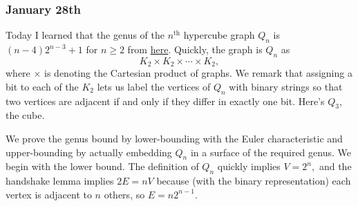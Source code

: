 \subsubsection{January 28th}
Today I learned that the genus of the $n^\text{th}$ hypercube graph $Q_n$ is $(n-4)2^{n-3}+1$ for $n\ge2$ from \href{https://www.cambridge.org/core/journals/canadian-journal-of-mathematics/article/genus-of-the-ncube/C0E3405F0B3267A4792D0DB8CFC140D4}{here}. Quickly, the graph is $Q_n$ as
\[K_2\times K_2\times\cdots\times K_2,\]
where $\times$ is denoting the Cartesian product of graphs. We remark that assigning a bit to each of the $K_2$ lets us label the vertices of $Q_n$ with binary strings so that two vertices are adjacent if and only if they differ in exactly one bit. Here's $Q_3,$ the cube.
\begin{center}
\end{center}

We prove the genus bound by lower-bounding with the Euler characteristic and upper-bounding by actually embedding $Q_n$ in a surface of the required genus. We begin with the lower bound. The definition of $Q_n$ quickly implies $V=2^n,$ and the handshake lemma implies $2E=nV$ because (with the binary representation) each vertex is adjacent to $n$ others, so $E=n2^{n-1}.$ 

